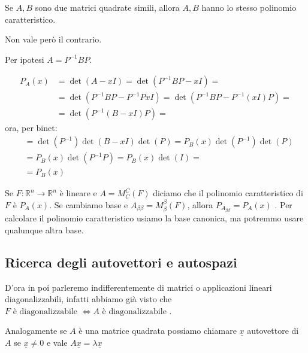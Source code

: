 \documentclass[
  a4paper,
]{article}
\begin{document}
\begin{propositionbox}
Se \(A, B\) sono due matrici quadrate simili, allora \(A, B\) hanno lo
stesso polinomio caratteristico.
\end{propositionbox}

\begin{notebox}
Non vale però il contrario.
\end{notebox}

\begin{proofbox}
Per ipotesi \(A = P^{-1}BP\).

\[ 
\begin{aligned}
P_A(x) &=\det(A - xI) = \det(P^{-1}BP - xI) = \\
&=\det(P^{-1}BP - P^{-1}PxI) = \det(P^{-1}BP - P^{-1}(xI)P) = \\
&=\det(P^{-1}(B-xI)P) =
\end{aligned}
\] ora, per binet: \[
\begin{aligned}
&=\det(P^{-1})\det(B-xI) \det(P) = P_B(x)\det(P^{-1})\det(P)\\
&=P_B(x)\det(P^{-1}P) =P_B(x)\det(I) = \\
&=P_B(x)
\end{aligned}
\]
\end{proofbox}

\begin{observationbox}
Se \(F: \mathbb{R}^n \to \mathbb{R}^n\) è lineare e \(A = M^{C}_{C}(F)\)
diciamo che il polinomio caratteristico di \(F\) è \(P_A(x)\). Se
cambiamo base e \(A_{\beta\beta} = M^{{\beta}}_{\beta}(F)\), allora
\(P_{A_{\beta\beta}} = P_A(x)\) . Per calcolare il polinomio
caratteristico usiamo la base canonica, ma potremmo usare qualunque
altra base.
\end{observationbox}

\hypertarget{ricerca-degli-autovettori-e-autospazi}{%
\subsection{Ricerca degli autovettori e
autospazi}\label{ricerca-degli-autovettori-e-autospazi}}

D'ora in poi parleremo indifferentemente di matrici o applicazioni
lineari diagonalizzabili, infatti abbiamo già visto che
\(F \text{ è diagonalizzabile } \iff A \text{ è diagonalizzabile }\).

Analogamente se \(A\) è una matrice quadrata possiamo chiamare
\(\underline{x}\) autovettore di \(A\) se \(\underline{x} \not = 0\) e
vale \(A\underline{x} = \lambda \underline{x}\)
\end{document}
